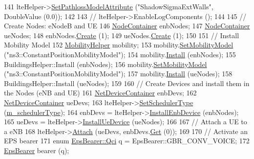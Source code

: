 \begin{DoxyCode}
141   lteHelper->\hyperlink{classns3_1_1LteHelper_aa96ebbd6845ca61c2b5e08e84481a348}{SetPathlossModelAttribute} (\textcolor{stringliteral}{"ShadowSigmaExtWalls"}, DoubleValue (0.0));
142   
143 \textcolor{comment}{//   lteHelper->EnableLogComponents ();}
144 
145   \textcolor{comment}{// Create Nodes: eNodeB and UE}
146   \hyperlink{classns3_1_1NodeContainer}{NodeContainer} enbNodes;
147   \hyperlink{classns3_1_1NodeContainer}{NodeContainer} ueNodes;
148   enbNodes.\hyperlink{classns3_1_1NodeContainer_a787f059e2813e8b951cc6914d11dfe69}{Create} (1);
149   ueNodes.\hyperlink{classns3_1_1NodeContainer_a787f059e2813e8b951cc6914d11dfe69}{Create} (1);
150 
151   \textcolor{comment}{// Install Mobility Model}
152   \hyperlink{classns3_1_1MobilityHelper}{MobilityHelper} mobility;
153   mobility.\hyperlink{classns3_1_1MobilityHelper_a030275011b6f40682e70534d30280aba}{SetMobilityModel} (\textcolor{stringliteral}{"ns3::ConstantPositionMobilityModel"});
154   mobility.\hyperlink{classns3_1_1MobilityHelper_a07737960ee95c0777109cf2994dd97ae}{Install} (enbNodes);
155   BuildingsHelper::Install (enbNodes);
156   mobility.\hyperlink{classns3_1_1MobilityHelper_a030275011b6f40682e70534d30280aba}{SetMobilityModel} (\textcolor{stringliteral}{"ns3::ConstantPositionMobilityModel"});
157   mobility.\hyperlink{classns3_1_1MobilityHelper_a07737960ee95c0777109cf2994dd97ae}{Install} (ueNodes);
158   BuildingsHelper::Install (ueNodes);
159 
160   \textcolor{comment}{// Create Devices and install them in the Nodes (eNB and UE)}
161   \hyperlink{classns3_1_1NetDeviceContainer}{NetDeviceContainer} enbDevs;
162   \hyperlink{classns3_1_1NetDeviceContainer}{NetDeviceContainer} ueDevs;
163   lteHelper->\hyperlink{classns3_1_1LteHelper_a8f86e55b8b80a81732c4b2df00fb25d5}{SetSchedulerType} (\hyperlink{classLenaMimoTestCase_a462839a0431fbfbc7650a5b1bfe1004c}{m\_schedulerType});
164   enbDevs = lteHelper->\hyperlink{classns3_1_1LteHelper_a5e009ad35ef85f46b5a6099263f15a03}{InstallEnbDevice} (enbNodes);
165   ueDevs = lteHelper->\hyperlink{classns3_1_1LteHelper_ac9cd932d7de92811cfa953c2e3b2fc9f}{InstallUeDevice} (ueNodes);
166   
167   \textcolor{comment}{// Attach a UE to a eNB}
168   lteHelper->\hyperlink{classns3_1_1LteHelper_a9466743f826aa2652a87907b7f0a1c87}{Attach} (ueDevs, enbDevs.\hyperlink{classns3_1_1NetDeviceContainer_a677d62594b5c9d2dea155cc5045f4d0b}{Get} (0));
169 
170   \textcolor{comment}{// Activate an EPS bearer}
171   \textcolor{keyword}{enum} \hyperlink{structns3_1_1EpsBearer_aecf0c67109c5eb4ec0b07226fff5885e}{EpsBearer::Qci} q = EpsBearer::GBR\_CONV\_VOICE;
172   \hyperlink{structns3_1_1EpsBearer}{EpsBearer} bearer (q);

\end{DoxyCode}

